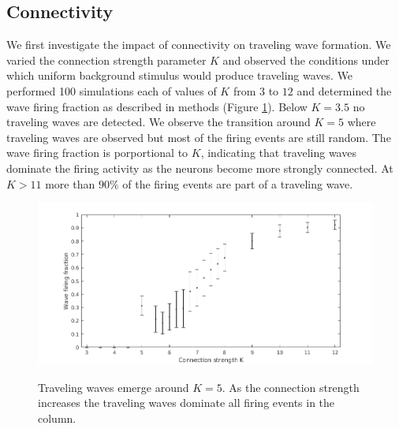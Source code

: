 \documentclass[a4paper,11pt]{article}
\begin{document}
\subsection{Connectivity} \label{sub:connectivity}
We first investigate the impact of connectivity on traveling wave formation.
We varied the connection strength parameter $K$ and observed the conditions under which uniform background stimulus would produce traveling waves.
We performed 100 simulations each of values of $K$ from $3$ to $12$ and determined the wave firing fraction as described in methods (Figure \ref{fig:conn_fraction}).
Below $K=3.5$ no traveling waves are detected.
We observe the transition around $K=5$ where traveling waves are observed but most of the firing events are still random.
The wave firing fraction is porportional to $K$, indicating that traveling waves dominate the firing activity as the neurons become more strongly connected.
At $K>11$ more than $90\%$ of the firing events are part of a traveling wave.
\begin{figure}[!htb]
 \caption{Traveling waves emerge around $K=5$. As the connection strength increases the traveling waves dominate all firing events in the column.}
 \centering
   \includegraphics[width=\textwidth]{fig/ConnectionStrengthWaveFraction}  
 \label{fig:conn_fraction}
\end{figure}
\end{document}
